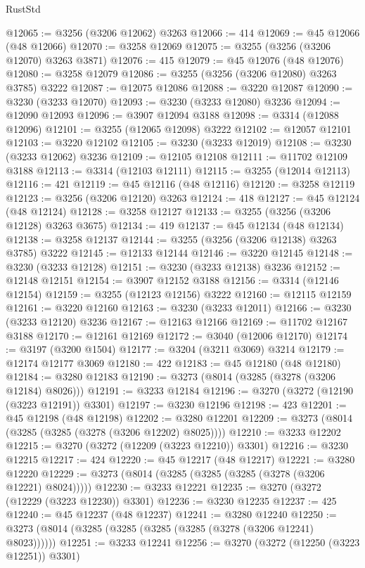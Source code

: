 \begin{lexlean}{RustStd}
\begin{coremodule}
{\begin{coremodule}
{{{{{{{{{{{{{{{{{{{{{{{{{{{{{{{{{{{{{@12065 := @3256 (@3206 @12062) @3263
@12066 := 414
@12069 := @45 @12066 (@48 @12066)
@12070 := @3258 @12069
@12075 := @3255 (@3256 (@3206 @12070) @3263 @3871)
@12076 := 415
@12079 := @45 @12076 (@48 @12076)
@12080 := @3258 @12079
@12086 := @3255 (@3256 (@3206 @12080) @3263 @3785) @3222
@12087 := @12075 @12086
@12088 := @3220 @12087
@12090 := @3230 (@3233 @12070)
@12093 := @3230 (@3233 @12080) @3236
@12094 := @12090 @12093
@12096 := @3907 @12094 @3188
@12098 := @3314 (@12088 @12096)
@12101 := @3255 (@12065 @12098) @3222
@12102 := @12057 @12101
@12103 := @3220 @12102
@12105 := @3230 (@3233 @12019)
@12108 := @3230 (@3233 @12062) @3236
@12109 := @12105 @12108
@12111 := @11702 @12109 @3188
@12113 := @3314 (@12103 @12111)
@12115 := @3255 (@12014 @12113)
@12116 := 421
@12119 := @45 @12116 (@48 @12116)
@12120 := @3258 @12119
@12123 := @3256 (@3206 @12120) @3263
@12124 := 418
@12127 := @45 @12124 (@48 @12124)
@12128 := @3258 @12127
@12133 := @3255 (@3256 (@3206 @12128) @3263 @3675)
@12134 := 419
@12137 := @45 @12134 (@48 @12134)
@12138 := @3258 @12137
@12144 := @3255 (@3256 (@3206 @12138) @3263 @3785) @3222
@12145 := @12133 @12144
@12146 := @3220 @12145
@12148 := @3230 (@3233 @12128)
@12151 := @3230 (@3233 @12138) @3236
@12152 := @12148 @12151
@12154 := @3907 @12152 @3188
@12156 := @3314 (@12146 @12154)
@12159 := @3255 (@12123 @12156) @3222
@12160 := @12115 @12159
@12161 := @3220 @12160
@12163 := @3230 (@3233 @12011)
@12166 := @3230 (@3233 @12120) @3236
@12167 := @12163 @12166
@12169 := @11702 @12167 @3188
@12170 := @12161 @12169
@12172 := @3040 (@12006 @12170)
@12174 := @3197 (@3200 @1504)
@12177 := @3204 (@3211 @3069) @3214
@12179 := @12174 @12177 @3069
@12180 := 422
@12183 := @45 @12180 (@48 @12180)
@12184 := @3280 @12183
@12190 := @3273 (@8014 (@3285 (@3278 (@3206 @12184) @8026)))
@12191 := @3233 @12184
@12196 := @3270 (@3272 (@12190 (@3223 @12191)) @3301)
@12197 := @3230 @12196
@12198 := 423
@12201 := @45 @12198 (@48 @12198)
@12202 := @3280 @12201
@12209 := @3273 (@8014 (@3285 (@3285 (@3278 (@3206 @12202) @8025))))
@12210 := @3233 @12202
@12215 := @3270 (@3272 (@12209 (@3223 @12210)) @3301)
@12216 := @3230 @12215
@12217 := 424
@12220 := @45 @12217 (@48 @12217)
@12221 := @3280 @12220
@12229 := @3273 (@8014 (@3285 (@3285 (@3285 (@3278 (@3206 @12221) @8024)))))
@12230 := @3233 @12221
@12235 := @3270 (@3272 (@12229 (@3223 @12230)) @3301)
@12236 := @3230 @12235
@12237 := 425
@12240 := @45 @12237 (@48 @12237)
@12241 := @3280 @12240
@12250 := @3273 (@8014 (@3285 (@3285 (@3285 (@3285 (@3278 (@3206 @12241) @8023))))))
@12251 := @3233 @12241
@12256 := @3270 (@3272 (@12250 (@3223 @12251)) @3301)
}}}}}}}}}}}}}}}}}}}}}}}}}}}}}}}}}}}}}
\end{coremodule}}
\end{coremodule}
\end{lexlean}
